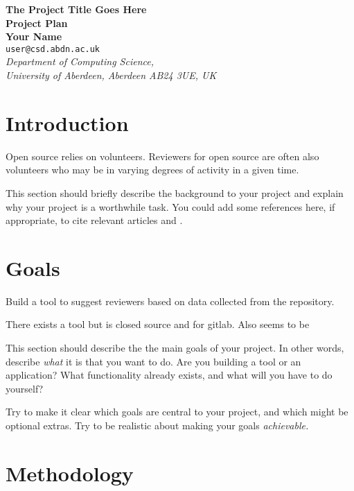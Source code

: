 \documentclass[a4paper,12pt]{article}
\begin{document}
\begin{center}
{\Large\bf{The Project Title Goes Here}} \\
      \vspace{5.0mm}
{\Large\bf{Project Plan}} \\
      \vspace{8mm}
      {\large\bf{Your Name}}  \\
      \vspace{5.0mm}
       {\tt user@csd.abdn.ac.uk} \\
      \vspace{5.0mm}
      {\em Department of Computing Science,\\
       University of Aberdeen, Aberdeen AB24 3UE, UK} 
\end{center}


\section*{Introduction}

Open source relies on volunteers. Reviewers for open source are often also volunteers who may be in varying degrees of activity in a given time.

This section should briefly describe the background to your
project and explain why your project is a worthwhile task.
You could add some references here, if appropriate, to cite 
relevant articles
\cite{wooldridge2002,shoham95} and \cite{garcia-camino2005}.

\section*{Goals}

Build a tool to suggest reviewers based on data collected from the repository.

There exists a tool but is closed source and for gitlab. Also seems to be 

This section should describe the the main goals of your project.
In other words, describe {\em what} it is that you want to do.
Are you building a tool or an application? What functionality 
already exists, and what will you have to do yourself?

Try to make it clear which goals are central to your project, and which
might be optional extras. Try to be realistic about making your
goals {\em achievable.}


\section*{Methodology}
\end{document}
